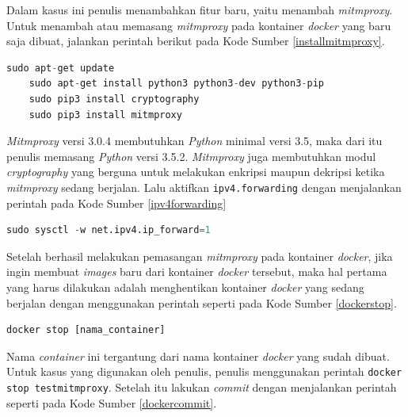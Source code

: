 	\indent Dalam kasus ini penulis menambahkan fitur baru, yaitu menambah \textit{mitmproxy}. Untuk menambah atau memasang \textit{mitmproxy} pada kontainer \textit{docker} yang baru saja dibuat, jalankan perintah berikut pada Kode Sumber \ref{installmitmproxy}.
	\newline
	\begin{minipage}{\linewidth}
	\begin{lstlisting}[caption=Perintah untuk Pemasangan \textit{Mitmproxy},language=Python,label=installmitmproxy]
	sudo apt-get update
	sudo apt-get install python3 python3-dev python3-pip
	sudo pip3 install cryptography
	sudo pip3 install mitmproxy
	\end{lstlisting}
	\end{minipage}
	
	\textit{Mitmproxy} versi 3.0.4 membutuhkan \textit{Python} minimal versi 3.5, maka dari itu penulis memasang \textit{Python} versi 3.5.2. \textit{Mitmproxy} juga membutuhkan modul \textit{cryptography} yang berguna untuk melakukan enkripsi maupun dekripsi ketika \textit{mitmproxy} sedang berjalan. Lalu aktifkan \texttt{ipv4.forwarding} dengan menjalankan perintah pada Kode Sumber \ref{ipv4forwarding}\\
	\newline
	\begin{minipage}{\linewidth}
	\begin{lstlisting}[caption=Perintah untuk Mengaktifkan \textit{ipv4.forwarding},language=Python,label=ipv4forwarding]
  sudo sysctl -w net.ipv4.ip_forward=1
	\end{lstlisting}
	\end{minipage}
	\indent Setelah berhasil melakukan pemasangan \textit{mitmproxy} pada kontainer \textit{docker}, jika ingin membuat \textit{images} baru dari kontainer \textit{docker} tersebut, maka hal pertama yang harus dilakukan adalah menghentikan kontainer \textit{docker} yang sedang berjalan dengan menggunakan perintah seperti pada Kode Sumber \ref{dockerstop}.
	\newline
	\begin{minipage}{\linewidth}
	\begin{lstlisting}[caption=Perintah untuk Menghentikan Kontainer \textit{Docker},language=Python,label=dockerstop]
	docker stop [nama_container]
	\end{lstlisting}
	\end{minipage}
	Nama \textit{container} ini tergantung dari nama kontainer \textit{docker} yang sudah dibuat. Untuk kasus yang digunakan oleh penulis, penulis menggunakan perintah \texttt{docker stop testmitmproxy}. Setelah itu lakukan \textit{commit} dengan menjalankan perintah seperti pada Kode Sumber \ref{dockercommit}.
